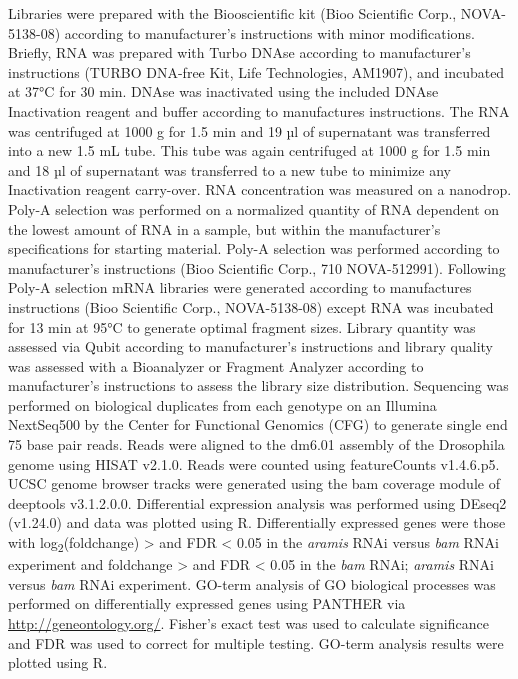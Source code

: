 \documentclass[12pt,oneside]{reedthesis}
\begin{document}
Libraries were prepared with the Biooscientific kit (Bioo Scientific Corp., NOVA-5138-08) according to manufacturer's instructions with minor modifications. Briefly, RNA was prepared with Turbo DNAse according to manufacturer's instructions (TURBO DNA-free Kit, Life Technologies, AM1907), and incubated at 37°C for 30 min. DNAse was inactivated using the included DNAse Inactivation reagent and buffer according to manufactures instructions. The RNA was centrifuged at 1000 g for 1.5 min and 19 µl of supernatant was transferred into a new 1.5 mL tube. This tube was again centrifuged at 1000 g for 1.5 min and 18 µl of supernatant was transferred to a new tube to minimize any Inactivation reagent carry-over. RNA concentration was measured on a nanodrop. Poly-A selection was performed on a normalized quantity of RNA dependent on the lowest amount of RNA in a sample, but within the manufacturer's specifications for starting material. Poly-A selection was performed according to manufacturer's instructions (Bioo Scientific Corp., 710 NOVA-512991). Following Poly-A selection mRNA libraries were generated according to manufactures instructions (Bioo Scientific Corp., NOVA-5138-08) except RNA was incubated for 13 min at 95°C to generate optimal fragment sizes. Library quantity was assessed via Qubit according to manufacturer's instructions and library quality was assessed with a Bioanalyzer or Fragment Analyzer according to manufacturer's instructions to assess the library size distribution. Sequencing was performed on biological duplicates from each genotype on an Illumina NextSeq500 by the Center for Functional Genomics (CFG) to generate single end 75 base pair reads. Reads were aligned to the dm6.01 assembly of the Drosophila genome using HISAT v2.1.0. Reads were counted using featureCounts v1.4.6.p5. UCSC genome browser tracks were generated using the bam coverage module of deeptools v3.1.2.0.0. Differential expression analysis was performed using DEseq2 (v1.24.0) and data was plotted using R. Differentially expressed genes were those with log\textsubscript{2}(foldchange) \textgreater{} \textbar{} and FDR \textless{} 0.05 in the \emph{aramis} RNAi versus \emph{bam} RNAi experiment and foldchange \textgreater{} \textbar{} and FDR \textless{} 0.05 in the \emph{bam} RNAi; \emph{aramis} RNAi versus \emph{bam} RNAi experiment. GO-term analysis of GO biological processes was performed on differentially expressed genes using PANTHER via \url{http://geneontology.org/}. Fisher's exact test was used to calculate significance and FDR was used to correct for multiple testing. GO-term analysis results were plotted using R.
\end{document}

